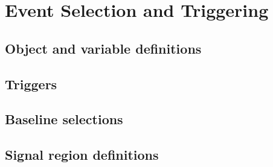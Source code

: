 \chapter{Event Selection and Triggering}

\section{Object and variable definitions}
\label{sec:objvardefs}

\section{Triggers}

\section{Baseline selections}

\section{Signal region definitions}
